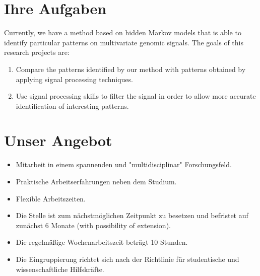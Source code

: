 \documentclass[11pt]{article}
\begin{document}
\section{Ihre Aufgaben}
\label{sec:ihreaufgaben}

Currently, we have a method based on  hidden Markov models that is able to identify particular patterns on multivariate genomic signals. The goals of this research projects are:
\begin{enumerate}
  \item Compare the patterns identified by our method with patterns obtained by applying signal processing techniques.
  \item Use signal processing skills to filter the signal in order to allow more accurate identification of interesting patterns.
\end{enumerate}

\section{Unser Angebot}
\label{sec:unserangebot}

\begin{itemize}
  \item Mitarbeit in einem spannenden und "multidisciplinar" Forschungsfeld.
  \item Praktische Arbeitserfahrungen neben dem Studium.
  \item Flexible Arbeitszeiten.
  \item Die Stelle ist zum n{\"a}chstm{\"o}glichen Zeitpunkt zu besetzen und befristet auf zun{\"a}chst 6 Monate (with possibility of extension).
  \item Die regelm{\"a}{\ss}ige Wochenarbeitszeit betr{\"a}gt 10 Stunden.
  \item Die Eingruppierung richtet sich nach der Richtlinie f{\"u}r studentische und wissenschaftliche Hilfskr{\"a}fte.

\end{itemize}
\end{document}
